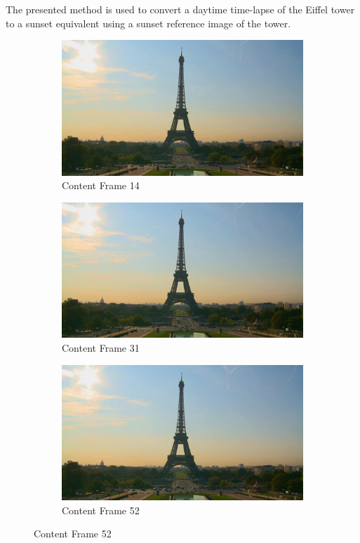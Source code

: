 \documentclass[runningheads]{llncs}
\begin{document}
The presented method is used to convert a daytime time-lapse of the Eiffel tower to a sunset equivalent using a sunset reference image of the tower.
\begin{figure}[h!]
\centering
\begin{subfigure}[t]{0.3\linewidth}
    \centering
    \includegraphics[width=1\linewidth]{small_0014.png}
    \caption{Content Frame 14}
\end{subfigure}
\begin{subfigure}[t]{0.3\linewidth}
    \centering
    \includegraphics[width=1\linewidth]{small_0031.png}
    \caption{Content Frame 31}
\end{subfigure}
\begin{subfigure}[t]{0.3\linewidth}
    \centering
    \includegraphics[width=1\linewidth]{small_0052.png}
    \caption{Content Frame 52}
\end{subfigure}


\end{figure}
\end{document}
